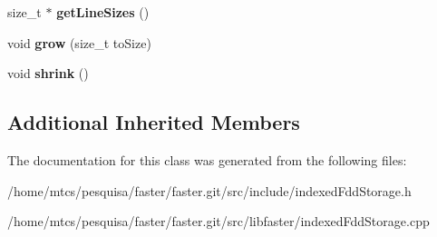 \begin{DoxyCompactItemize}
\item 
\hypertarget{classfaster_1_1indexedFddStorage_3_01K_00_01T_01_5_01_4_afcd47bbdf16da04e198540af06c43a3a}{}size\+\_\+t $\ast$ {\bfseries get\+Line\+Sizes} ()\label{classfaster_1_1indexedFddStorage_3_01K_00_01T_01_5_01_4_afcd47bbdf16da04e198540af06c43a3a}

\item 
\hypertarget{classfaster_1_1indexedFddStorage_3_01K_00_01T_01_5_01_4_a47a8f1370e5b9c5a5cff40e77b241731}{}void {\bfseries grow} (size\+\_\+t to\+Size)\label{classfaster_1_1indexedFddStorage_3_01K_00_01T_01_5_01_4_a47a8f1370e5b9c5a5cff40e77b241731}

\item 
\hypertarget{classfaster_1_1indexedFddStorage_3_01K_00_01T_01_5_01_4_a69e570aeb85d7e3f8e3d2878773e9567}{}void {\bfseries shrink} ()\label{classfaster_1_1indexedFddStorage_3_01K_00_01T_01_5_01_4_a69e570aeb85d7e3f8e3d2878773e9567}

\end{DoxyCompactItemize}
\subsection*{Additional Inherited Members}


The documentation for this class was generated from the following files\+:\begin{DoxyCompactItemize}
\item 
/home/mtcs/pesquisa/faster/faster.\+git/src/include/indexed\+Fdd\+Storage.\+h\item 
/home/mtcs/pesquisa/faster/faster.\+git/src/libfaster/indexed\+Fdd\+Storage.\+cpp\end{DoxyCompactItemize}
